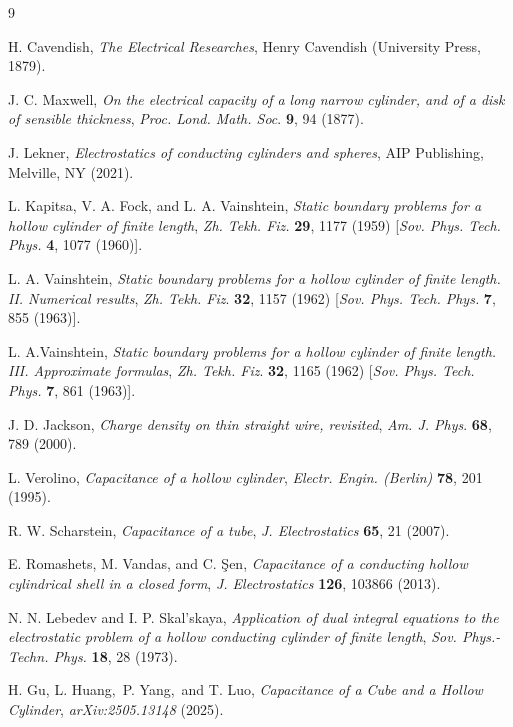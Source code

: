 \documentclass[12pt]{article}
\begin{document}
\begin{thebibliography}{9}                                                                                                %

H. Cavendish, \textit{The Electrical Researches}, Henry Cavendish
(University Press, 1879).

J. C. Maxwell, \textit{On the electrical capacity of a long
narrow cylinder, and of a disk of sensible thickness}, \emph{Proc. Lond. Math.
Soc}. \textbf{9}, 94 (1877).

J. Lekner, \textit{Electrostatics of conducting cylinders and
spheres}, AIP Publishing, Melville, NY (2021).

L. Kapitsa, V. A. Fock, and L. A. Vainshtein, \textit{Static
boundary problems for a hollow cylinder of finite length}, \emph{Zh. Tekh.
Fiz.} \textbf{29}, 1177 (1959) [\emph{Sov. Phys. Tech. Phys.} \textbf{4}, 1077 (1960)].

L. A. Vainshtein, \textit{Static boundary problems for a hollow
cylinder of finite length. II. Numerical results}, \emph{Zh. Tekh. Fiz}.
\textbf{32}, 1157 (1962) [\emph{Sov. Phys. Tech. Phys.} \textbf{7}, 855 (1963)].

L. A.Vainshtein, \textit{Static boundary problems for a hollow
cylinder of finite length. III. Approximate formulas}, \textit{Zh. Tekh. Fiz}.
\textbf{32}, 1165 (1962) [\emph{Sov. Phys. Tech. Phys.} \textbf{7}, 861 (1963)].

J. D. Jackson, \textit{Charge density on thin straight wire,
revisited}, \emph{Am. J. Phys}. \textbf{68}, 789 (2000).

L. Verolino, \textit{Capacitance of a hollow cylinder},
\emph{Electr. Engin. (Berlin)} \textbf{78}, 201 (1995).

R. W. Scharstein, \textit{Capacitance of a tube}, \emph{J.
Electrostatics} \textbf{65}, 21 (2007).

E. Romashets, M. Vandas, and C. \c{S}en, \textit{Capacitance of a
conducting hollow cylindrical shell in a closed form}, \emph{J.
Electrostatics} \textbf{126}, 103866 (2013).

N. N. Lebedev and I. P. Skal'skaya, \textit{Application of dual
integral equations to the electrostatic problem of a hollow conducting
cylinder of finite length}, \emph{Sov. Phys.-Techn. Phys.} \textbf{18}, 28 (1973).

H. Gu, L. Huang,\ P. Yang,\ and T. Luo, \textit{Capacitance of
a Cube and a Hollow Cylinder}, \qquad\emph{arXiv:2505.13148} (2025).


\end{thebibliography}
\end{document}
